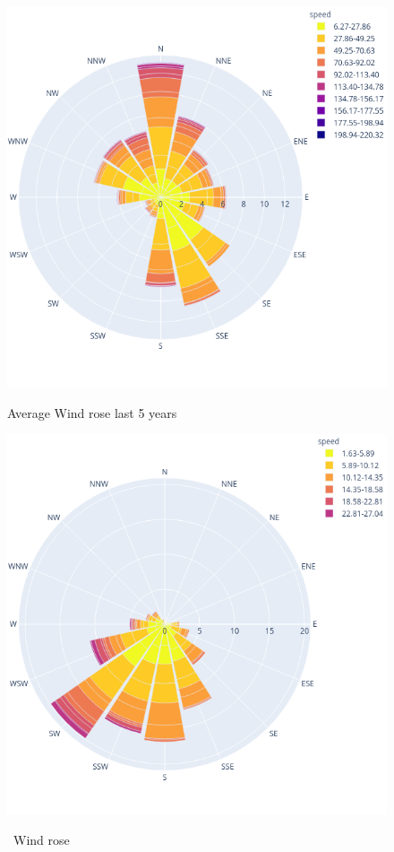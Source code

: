 \documentclass[12pt, oneside]{book}
\begin{document}
{\begin{figure}[H]
\begin{minipage}[b]{0.5\textwidth}
\includegraphics[width=\textwidth]{windrose5yrs}
\caption{Average Wind rose last 5 years}\label{windrose10years}
\end{minipage}
\begin{minipage}[b]{0.5\textwidth}
\includegraphics[width=\textwidth]{windrosemonth}\label{windrosemonth}
\caption{\monthyear \ Wind rose}
\end{minipage}
\end{figure}}
\end{document}

